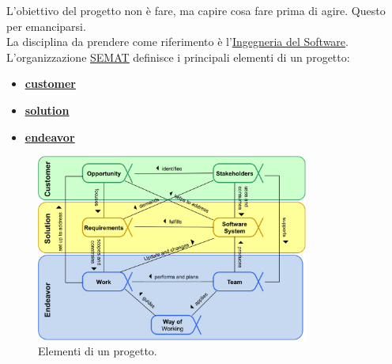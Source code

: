 		L'obiettivo del progetto non è fare, ma capire cosa fare prima di agire. Questo per emanciparsi. \\
		La disciplina da prendere come riferimento è l'\underline{\hyperref[swe]{Ingegneria del Software}}.\\
		L'organizzazione \underline{\hyperref[semat]{SEMAT}} definisce i principali elementi di un progetto:
			\begin{itemize}
				\item \textbf{\underline{\hyperref[customer]{customer}}}
				\item \textbf{\underline{\hyperref[solution]{solution}}}
				\item \textbf{\underline{\hyperref[endeavor]{endeavor}}}
			\end{itemize}

		\begin{figure}[H]
			\centering
			\includegraphics[width=0.8\textwidth]{img/prog}
			\caption{Elementi di un progetto.}
		\end{figure}


		\begin{figure}[H]
			\centering
			\qquad
		\end{figure}

